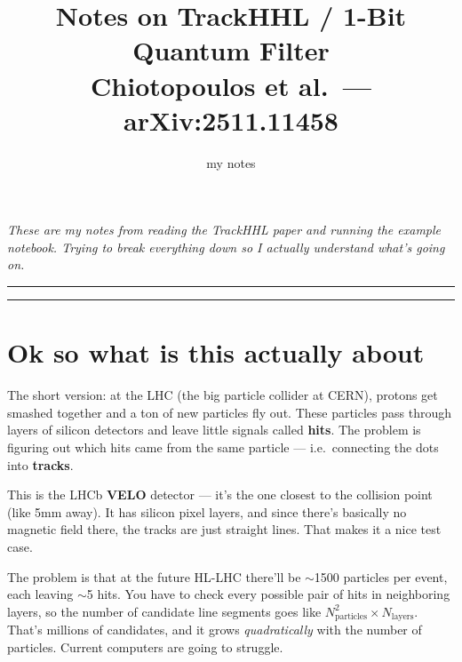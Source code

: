 \documentclass[11pt, a4paper]{article}
\title{Notes on TrackHHL / 1-Bit Quantum Filter\\[4pt]
       \large Chiotopoulos et al.\ --- arXiv:2511.11458}
\author{my notes}
\date{}
\begin{document}
\maketitle

\noindent\textit{These are my notes from reading the TrackHHL paper and
running the example notebook. Trying to break everything down so I actually
understand what's going on.}

\bigskip
\hrule
\tableofcontents
\hrule
\newpage

\section{Ok so what is this actually about}

The short version: at the LHC (the big particle collider at CERN), protons
get smashed together and a ton of new particles fly out. These particles pass
through layers of silicon detectors and leave little signals called
\textbf{hits}. The problem is figuring out which hits came from the same
particle --- i.e.\ connecting the dots into \textbf{tracks}.

\begin{center}
\end{center}

This is the LHCb \textbf{VELO} detector --- it's the one closest to the
collision point (like 5mm away). It has silicon pixel layers, and since
there's basically no magnetic field there, the tracks are just straight
lines. That makes it a nice test case.

\medskip
The problem is that at the future HL-LHC there'll be $\sim$1500 particles
per event, each leaving $\sim$5 hits. You have to check every possible pair
of hits in neighboring layers, so the number of candidate line segments goes
like $N_{\text{particles}}^2 \times N_{\text{layers}}$. That's millions of
candidates, and it grows \emph{quadratically} with the number of particles.
Current computers are going to struggle.
\end{document}
